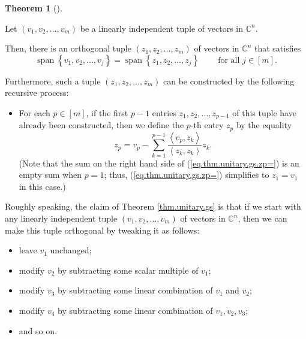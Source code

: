 \documentclass[numbers=enddot,12pt,final,onecolumn,notitlepage]{scrartcl}%
\numberwithin{exer}{subsection}
\theoremstyle{definition}
\newtheorem{theo}{Theorem}[subsection]
\newenvironment{theorem}[1][]
{\begin{theo}[#1]\begin{leftbar}}
{\end{leftbar}\end{theo}}
\let\sumnonlimits\sum
\renewcommand{\sum}{\sumnonlimits\limits}
\begin{document}
\begin{theorem}
[Gram--Schmidt process]\label{thm.unitary.gs}Let $\left(  v_{1},v_{2}%
,\ldots,v_{m}\right)  $ be a linearly independent tuple of vectors in
$\mathbb{C}^{n}$.

Then, there is an orthogonal tuple $\left(  z_{1},z_{2},\ldots,z_{m}\right)  $
of vectors in $\mathbb{C}^{n}$ that satisfies%
\[
\operatorname*{span}\left\{  v_{1},v_{2},\ldots,v_{j}\right\}
=\operatorname*{span}\left\{  z_{1},z_{2},\ldots,z_{j}\right\}
\ \ \ \ \ \ \ \ \ \ \text{for all }j\in\left[  m\right]  .
\]


Furthermore, such a tuple $\left(  z_{1},z_{2},\ldots,z_{m}\right)  $ can be
constructed by the following recursive process:

\begin{itemize}
\item For each $p\in\left[  m\right]  $, if the first $p-1$ entries
$z_{1},z_{2},\ldots,z_{p-1}$ of this tuple have already been constructed, then
we define the $p$-th entry $z_{p}$ by the equality%
\begin{equation}
z_{p}=v_{p}-\sum_{k=1}^{p-1}\dfrac{\left\langle v_{p},z_{k}\right\rangle
}{\left\langle z_{k},z_{k}\right\rangle }z_{k}. \label{eq.thm.unitary.gs.zp=}%
\end{equation}
(Note that the sum on the right hand side of (\ref{eq.thm.unitary.gs.zp=}) is
an empty sum when $p=1$; thus, (\ref{eq.thm.unitary.gs.zp=}) simplifies to
$z_{1}=v_{1}$ in this case.)
\end{itemize}
\end{theorem}

Roughly speaking, the claim of Theorem \ref{thm.unitary.gs} is that if we
start with any linearly independent tuple $\left(  v_{1},v_{2},\ldots
,v_{m}\right)  $ of vectors in $\mathbb{C}^{n}$, then we can make this tuple
orthogonal by tweaking it as follows:

\begin{itemize}
\item leave $v_{1}$ unchanged;

\item modify $v_{2}$ by subtracting some scalar multiple of $v_{1}$;

\item modify $v_{3}$ by subtracting some linear combination of $v_{1}$ and
$v_{2}$;

\item modify $v_{4}$ by subtracting some linear combination of $v_{1}%
,v_{2},v_{3}$;

\item and so on.
\end{itemize}
\end{document}
